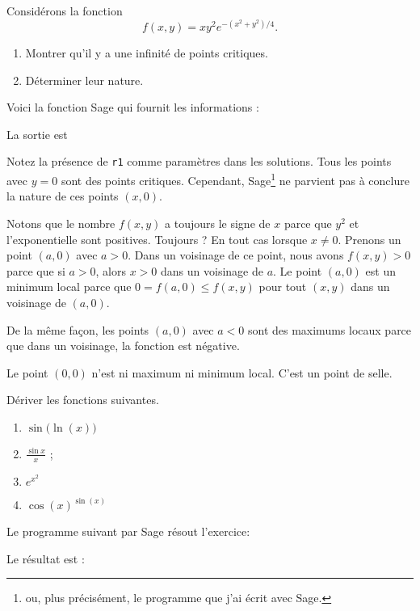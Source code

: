 \begin{example}     \label{exEEHPooKDxLTJ}


	Considérons la fonction
	\begin{equation}
		f(x,y)=xy^2 e^{-(x^2+y^2)/4}.
	\end{equation}
	\begin{enumerate}

		\item
		      Montrer qu'il y a une infinité de points critiques.
		\item
		      Déterminer leur nature.

	\end{enumerate}

	Voici la fonction Sage qui fournit les informations :

	

	La sortie est


	Notez la présence de \verb+r1+ comme paramètres dans les solutions. Tous les points avec $y=0$ sont des points critiques. Cependant, Sage\footnote{ou, plus précisément, le programme que j'ai écrit avec Sage.} ne parvient pas à conclure la nature de ces points $(x,0)$.

	Notons que le nombre $f(x,y)$ a toujours le signe de $x$ parce que $y^2$ et l'exponentielle sont positives. Toujours ? En tout cas lorsque $x\neq 0$. Prenons un point $(a,0)$ avec $a>0$. Dans un voisinage de ce point, nous avons $f(x,y)>0$ parce que si $a>0$, alors $x>0$ dans un voisinage de $a$. Le point $(a,0)$ est un minimum local parce que $0=f(a,0)\leq f(x,y)$ pour tout $(x,y)$ dans un voisinage de $(a,0)$.

	De la même façon, les points $(a,0)$ avec $a<0$ sont des maximums locaux parce que dans un voisinage, la fonction est négative.

	Le point $(0,0)$ n'est ni maximum ni minimum local. C'est un point de selle.

\end{example}

\begin{example}     \label{exRNZKooUIOfPU}

	Dériver les fonctions suivantes.
	\begin{enumerate}
		\item
		      $\sin\big( \ln(x) \big)$
		\item
		      $\displaystyle \frac{\sin x}{x}$ ;
		\item
		      $ e^{x^2}$
		\item
		      $\cos(x)^{\sin(x)}$
	\end{enumerate}

	Le programme suivant par Sage résout l'exercice:
	

	Le résultat est :

\end{example}


